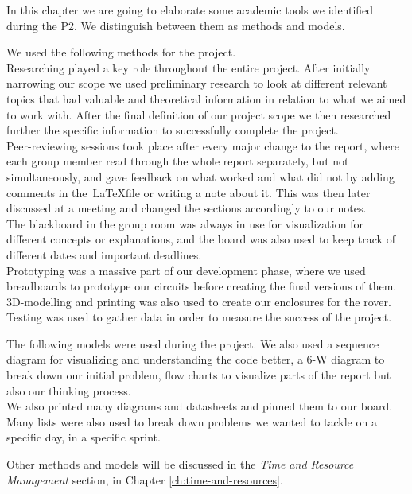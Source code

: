 

In this chapter we are going to elaborate some academic tools we identified during the P2. We distinguish between them as methods and models. 


We used the following methods for the project.\\
Researching played a key role throughout the entire project. After initially narrowing our scope we used preliminary research to look at different relevant topics that had valuable and theoretical information in relation to what we aimed to work with. After the final definition of our project scope we then researched further the specific information to successfully complete the project. \\
Peer-reviewing sessions took place after every major change to the report, where each group member read through the whole report separately, but not simultaneously, and gave feedback on what worked and what did not by adding comments in the~\LaTeX file or writing a note about it. This was then later discussed at a meeting and changed the sections accordingly to our notes.\\
The blackboard in the group room was always in use for visualization for different concepts or explanations, and the board was also used to keep track of different dates and important deadlines.\\
Prototyping was a massive part of our development phase, where we used breadboards to prototype our circuits before creating the final versions of them. 3D-modelling and printing was also used to create our enclosures for the rover.\\
Testing was used to gather data in order to measure the success of the project.

The following models were used during the project. We also used a sequence diagram for visualizing and understanding the code better, a 6-W diagram to break down our initial problem, flow charts to visualize parts of the report but also our thinking process.\\
We also printed many diagrams and datasheets and pinned them to our board. Many lists were also used to break down problems we wanted to tackle on a specific day, in a specific sprint.

Other methods and models will be discussed in the \textit{Time and Resource Management} section, in Chapter \ref{ch:time-and-resources}.

